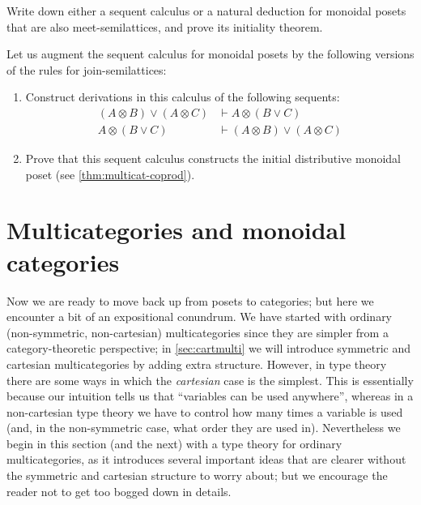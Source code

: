 \documentclass{book}
\let\types\vdash
\def\type{\;\ftype}
\let\join\vee
\let\tensor\otimes
\begin{document}
\begin{ex}\label{ex:monpos-mslat}
  Write down either a sequent calculus or a natural deduction for monoidal posets that are also meet-semilattices, and prove its initiality theorem.
\end{ex}

\begin{ex}\label{ex:monpos-jslat}
  Let us augment the sequent calculus for monoidal posets by the following versions of the rules for join-semilattices:
  \begin{enumerate}
  \item Construct derivations in this calculus of the following sequents:
    \begin{align*}
      (A\tensor B)\join (A\tensor C) &\types  A\tensor (B\join C)\\
      A\tensor (B\join C) &\types (A\tensor B)\join (A\tensor C)
    \end{align*}
  \item Prove that this sequent calculus constructs the initial distributive monoidal poset (see \cref{thm:multicat-coprod}).
  \end{enumerate}
\end{ex}


\section{Multicategories and monoidal categories}
\label{sec:multicat-moncat}

Now we are ready to move back up from posets to categories; but here we encounter a bit of an expositional conundrum.
We have started with ordinary (non-symmetric, non-cartesian) multicategories since they are simpler from a category-theoretic perspective; in \cref{sec:cartmulti} we will introduce symmetric and cartesian multicategories by adding extra structure.
However, in type theory there are some ways in which the \emph{cartesian} case is the simplest.
This is essentially because our intuition tells us that ``variables can be used anywhere'', whereas in a non-cartesian type theory we have to control how many times a variable is used (and, in the non-symmetric case, what order they are used in).
Nevertheless we begin in this section (and the next) with a type theory for ordinary multicategories, as it introduces several important ideas that are clearer without the symmetric and cartesian structure to worry about; but we encourage the reader not to get too bogged down in details.
\end{document}
